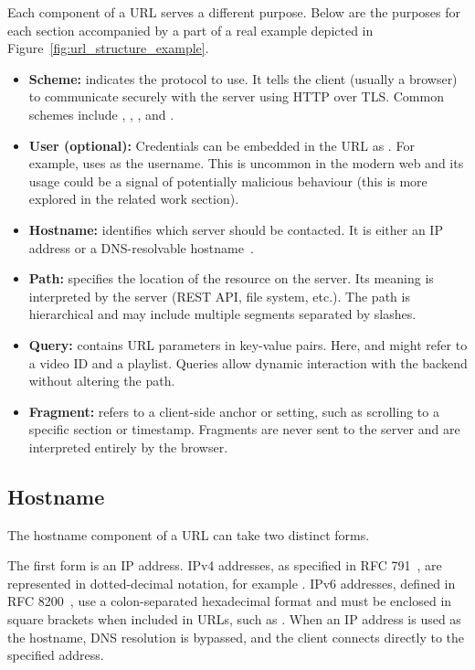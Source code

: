 Each component of a URL serves a different purpose. Below are the purposes for each section accompanied by a part of a real example depicted in Figure~\ref{fig:url_structure_example}.

\begin{itemize}
    \item \textbf{Scheme:}  indicates the protocol to use. It tells the client (usually a browser) to communicate securely with the server using HTTP over TLS. Common schemes include , , , and .
    \item \textbf{User (optional):} Credentials can be embedded in the URL as . For example,  uses  as the username. This is uncommon in the modern web and its usage could be a signal of potentially malicious behaviour (this is more explored in the related work section).
    \item \textbf{Hostname:}  identifies which server should be contacted. It is either an IP address or a DNS-resolvable hostname~\cite{rfc1035}.
    \item \textbf{Path:}  specifies the location of the resource on the server. Its meaning is interpreted by the server (REST API, file system, etc.). The path is hierarchical and may include multiple segments separated by slashes.
    \item \textbf{Query:}  contains URL parameters in key-value pairs. Here,  and  might refer to a video ID and a playlist. Queries allow dynamic interaction with the backend without altering the path.
    \item \textbf{Fragment:}  refers to a client-side anchor or setting, such as scrolling to a specific section or timestamp. Fragments are never sent to the server and are interpreted entirely by the browser.
\end{itemize}

\subsection{Hostname}
The hostname component of a URL can take two distinct forms.

The first form is an IP address. IPv4 addresses, as specified in RFC 791~\cite{rfc791}, are represented in dotted-decimal notation, for example . IPv6 addresses, defined in RFC 8200~\cite{rfc8200}, use a colon-separated hexadecimal format and must be enclosed in square brackets when included in URLs, such as \wrappedttt{[2001:db8::1]}. When an IP address is used as the hostname, DNS resolution is bypassed, and the client connects directly to the specified address.

